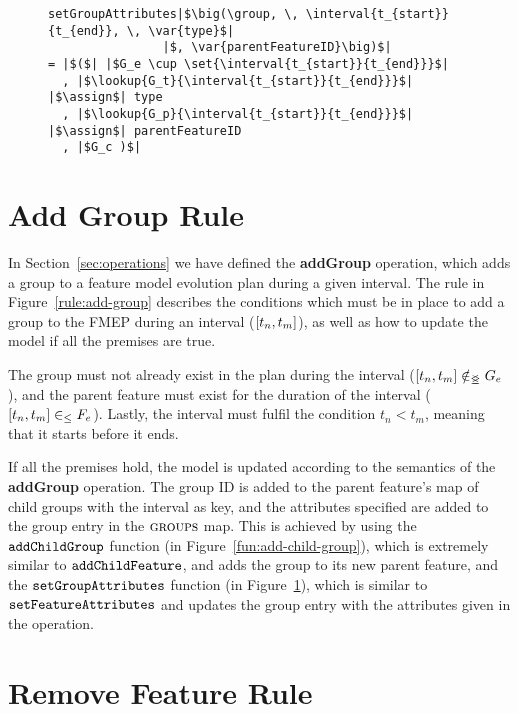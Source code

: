 \begin{figure}[hpbt]
  \begin{verbatim}
setGroupAttributes|$\big(\group, \, \interval{t_{start}}{t_{end}}, \, \var{type}$|
                |$, \var{parentFeatureID}\big)$|
= |$($| |$G_e \cup \set{\interval{t_{start}}{t_{end}}}$|
  , |$\lookup{G_t}{\interval{t_{start}}{t_{end}}}$| |$\assign$| type
  , |$\lookup{G_p}{\interval{t_{start}}{t_{end}}}$| |$\assign$| parentFeatureID
  , |$G_c )$|
  \end{verbatim}
  \caption{}
  \label{fun:set-group-attributes}
\end{figure}

\newpage
\section{Add Group Rule}
\label{sec:add-group-rule}
In Section~\ref{sec:operations} we have defined the \textbf{addGroup} operation, which adds a group to a feature model evolution plan during a given interval. The rule in Figure~\ref{rule:add-group} describes the conditions which must be in place to add a group to the FMEP during an interval ($\interval{t_n}{t_m}$), as well as how to update the model if all the premises are true.

The group must not already exist in the plan during the interval ($\interval{t_n}{t_m} \notinnr G_e$), and the parent feature must exist for the duration of the interval ($\interval{t_n}{t_m} \inn F_e$). Lastly, the interval must fulfil the condition $t_n < t_m$, meaning that it starts before it ends. 

If all the premises hold, the model is updated according to the semantics of the \textbf{addGroup} operation. The group ID is added to the parent feature's map of child groups with the interval as key, and the attributes specified are added to the group entry in the $\textsc{groups}{}$ map. This is achieved by using the $\texttt{add\-Child\-Group}$ function (in Figure~\ref{fun:add-child-group}), which is extremely similar to $\texttt{add\-Child\-Feature}$, and adds the group to its new parent feature, and the $\texttt{set\-Group\-Attributes}$ function (in Figure~\ref{fun:set-group-attributes}), which is similar to $\texttt{set\-Feature\-Attributes}$ and updates the group entry with the attributes given in the operation.

\section{Remove Feature Rule}
\label{sec:remove-feature-rule}

